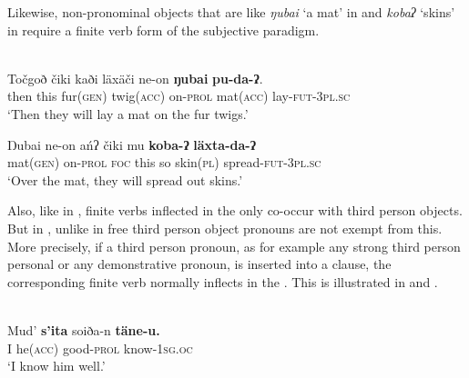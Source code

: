 \documentclass[output=paper]{LSP/langsci}
\begin{document}

Likewise, non-pronominal objects that are  like \textit{ŋubai} ‘a mat’ in  and \textit{kobaʔ} ‘skins’ in  require a finite verb form of the subjective paradigm.

\ea \label{12-wr-ex:27}
\\
\ea \label{12-wr-ex:27a}
\gll Točgoð čiki kaði läxäči ne-on \textbf{ŋubai} \textbf{pu-da-ʔ}.\\
 then this fur(\textsc{gen)} twig\textsc{(acc)} on-\textsc{prol} mat(\textsc{acc)} lay\textsc{-fut-3pl.sc}\\
\glt  ‘Then they will lay a mat on the fur twigs.’

\ex\label{12-wr-ex:27b}
\gll Ŋubai ne-on ańʔ čiki mu \textbf{koba-ʔ} \textbf{läxta-da-ʔ}\\
 mat(\textsc{gen)} on-\textsc{prol} \textsc{foc} this so skin(\textsc{pl)} spread-\textsc{fut-3pl.sc}\\
\glt  ‘Over the mat, they will spread out skins.’
\z
\z

Also, like in , finite verbs inflected in the  only co-occur with  third person objects. But in , unlike in  free  third person object pronouns are not exempt from this. More precisely, if a  third person  pronoun, as for example any strong third person personal or any demonstrative pronoun, is inserted into a clause, the corresponding finite verb normally inflects in the . This is illustrated in  and . 

\ea\label{12-wr-ex:28}
\\
\ea\label{12-wr-ex:28a}
\gll Mud’ \textbf{s’ita} soiða-n \textbf{täne-u.}\\
 I he(\textsc{acc)} good-\textsc{prol} know-\textsc{1sg.oc}\\
 \glt  ‘I know him well.’
\end{document}
